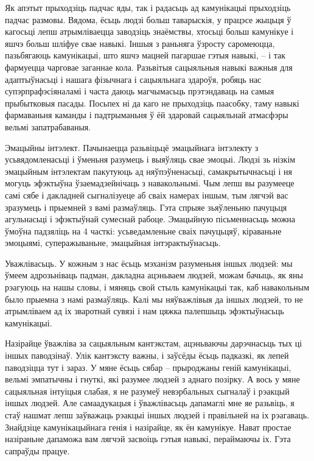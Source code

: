 Як апэтыт прыходзіць падчас яды, так і радасьць ад камунікацыі прыходзіць падчас размовы. Вядома, ёсьць людзі больш таварыскія, у працэсе жыцьця ў кагосьці лепш атрымліваецца заводзіць знаёмствы, хтосьці больш камунікуе і яшчэ больш шліфуе свае навыкі. Іншыя з раньняга ўзросту саромеюцца, пазьбягаюць камунікацыі, што яшчэ мацней пагаршае гэтыя навыкі, – і так фармуецца чарговае заганнае кола. Разьвітыя сацыяльныя навыкі важныя для адаптыўнасьці і нашага фізычнага і сацыяльнага здароўя, робяць нас супэрпрафэсіяналамі і часта даюць магчымасьць прэтэндаваць на самыя прыбытковыя пасады. Посьпех ні да каго не прыходзіць паасобку, таму навыкі фармаваньня каманды і падтрыманьня ў ёй здаровай сацыяльнай атмасфэры вельмі запатрабаваныя.

Эмацыйны інтэлект. Пачынаецца разьвіцьцё эмацыйнага інтэлекту з усьвядомленасьці і ўменьня разумець і выяўляць свае эмоцыі. Людзі зь нізкім эмацыйным інтэлектам пакутуюць ад няўпэўненасьці, самакрытычнасьці і ня могуць эфэктыўна ўзаемадзейнічаць з навакольнымі. Чым лепш вы разумееце самі сябе і дакладней сыгналізуеце аб сваіх намерах іншым, тым лягчэй вас зразумець і прыемней з вамі размаўляць. Гэта спрыяе зьяўленьню пачуцьця агульнасьці і эфэктыўнай сумеснай рабоце. Эмацыйную пісьменнасьць можна ўмоўна падзяліць на 4 часткі: усьведамленьне сваіх пачуцьцяў, кіраваньне эмоцыямі, суперажываньне, эмацыйная інтэрактыўнасьць.

Уважлівасьць. У кожным з нас ёсьць мэханізм разуменьня іншых людзей: мы ўмеем адрозьніваць падман, дакладна ацэньваем людзей, можам бачыць, як яны рэагуюць на нашы словы, і мяняць свой стыль камунікацыі так, каб навакольным было прыемна з намі размаўляць. Калі мы няўважлівыя да іншых людзей, то не атрымліваем ад іх зваротнай сувязі і нам цяжка палепшыць эфэктыўнасьць камунікацыі. 

Назірайце ўважліва за сацыяльным кантэкстам, ацэньваючы дарэчнасьць тых ці іншых паводзінаў. Улік кантэксту важны, і заўсёды ёсьць падказкі, як лепей паводзіцца тут і зараз. У мяне ёсьць сябар – прыроджаны геній камунікацыі, вельмі эмпатычны і гнуткі, які разумее людзей з аднаго позірку. А вось у мяне сацыяльная інтуіцыя слабая, я не разумеў невэрбальных сыгналаў і рэакцый іншых людзей. Але самаадукацыя і ўважлівасьць дапамаглі мне яе разьвіць, я стаў нашмат лепш заўважаць рэакцыі іншых людзей і правільней на іх рэагаваць. Знайдзіце камунікацыйнага генія і назірайце, як ён камунікуе. Нават простае назіраньне дапаможа вам лягчэй засвоіць гэтыя навыкі, пераймаючы іх. Гэта сапраўды працуе.


